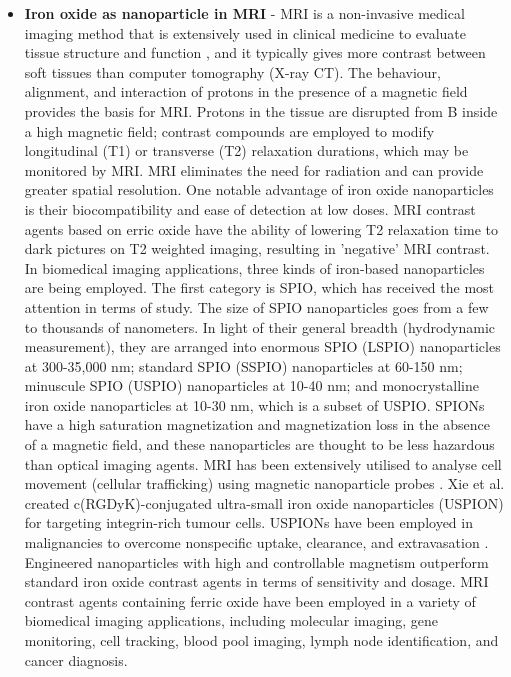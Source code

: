 \documentclass[12pt]{article}
\begin{document}
\begin{itemize}
    \item \textbf{Iron oxide as nanoparticle in MRI } - MRI is a non-invasive medical
    imaging method that is extensively used in clinical medicine to evaluate tissue structure and function , and it typically gives more contrast between soft tissues than computer tomography (X-ray CT). The behaviour, alignment, and interaction of protons in the presence of a magnetic field provides the basis for MRI. Protons in the tissue are disrupted from B inside a high magnetic field; contrast compounds are employed to modify longitudinal (T1) or transverse (T2) relaxation durations, which may be monitored by MRI. MRI eliminates the need for radiation and can provide greater spatial resolution. One notable advantage of iron oxide nanoparticles is their biocompatibility and ease of detection at low doses. MRI contrast agents based on erric oxide have the ability of lowering T2 relaxation time to dark pictures on T2 weighted imaging, resulting in 'negative' MRI contrast. In biomedical imaging applications, three kinds of iron-based nanoparticles are being employed. The first category is SPIO, which has received the most attention in terms of study. The size of SPIO nanoparticles goes from a few to thousands of nanometers. In light of their general breadth (hydrodynamic measurement), they are arranged into enormous SPIO (LSPIO) nanoparticles at 300-35,000 nm; standard SPIO (SSPIO) nanoparticles at 60-150 nm; minuscule SPIO (USPIO) nanoparticles at 10-40 nm; and monocrystalline iron oxide nanoparticles at 10-30 nm, which is a subset of USPIO. SPIONs have a high saturation magnetization and magnetization loss in the absence of a magnetic field, and these nanoparticles are thought to be less hazardous than optical imaging agents. MRI has been extensively utilised to analyse cell movement (cellular trafficking) using magnetic nanoparticle probes . Xie et al. created c(RGDyK)-conjugated ultra-small iron oxide nanoparticles (USPION) for targeting integrin-rich tumour cells. USPIONs have been employed in malignancies to overcome nonspecific uptake, clearance, and extravasation . Engineered nanoparticles with high and controllable magnetism outperform standard iron oxide contrast agents in terms of sensitivity and dosage. MRI contrast agents containing ferric oxide have been employed in a variety of biomedical imaging applications, including molecular imaging, gene monitoring, cell tracking, blood pool imaging, lymph node identification, and cancer diagnosis.

\end{itemize}
\end{document}
